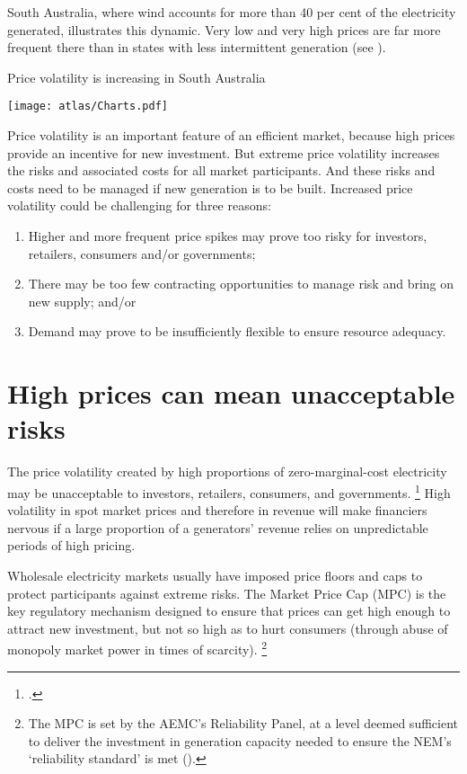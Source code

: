 \documentclass[FrontPage]{grattan}
\begin{document}
South Australia, where wind accounts for more than 40 per cent of the electricity generated, illustrates this dynamic. Very low and very high prices are far more frequent there than in states with less intermittent generation (see ).

\begin{figureTop}
\caption{Price volatility is increasing in South Australia}\label{fig:price-volatility-is-increasing-in-South-Australia}
\texttt{[image: atlas/Charts.pdf]}
\end{figureTop}

Price volatility is an important feature of an efficient market, because high prices provide an incentive for new investment. But extreme price volatility increases the risks and associated costs for all market participants. And these risks and costs need to be managed if new generation is to be built. Increased price volatility could be challenging for three reasons:
\begin{enumerate}
    \item Higher and more frequent price spikes may prove too risky for investors, retailers, consumers and/or governments;
    \item There may be too few contracting opportunities to manage risk and bring on new supply; and/or
    \item Demand may prove to be insufficiently flexible to ensure resource adequacy.
\end{enumerate}

\section{High prices can mean unacceptable risks}\label{sec:high-prices-mean-unacceptable-risks}
The price volatility created by high proportions of zero-marginal-cost electricity may be unacceptable to investors, retailers, consumers, and governments.%
\footcites{Nelson2016NewNEM}{AESO2016AlbertaMarketReform}
High volatility in spot market prices and therefore in revenue will make financiers nervous if a large proportion of a generators' revenue relies on unpredictable periods of high pricing. 

Wholesale electricity markets usually have imposed price floors and caps to protect participants against extreme risks. The Market Price Cap (MPC) is the key regulatory mechanism designed to ensure that prices can get high enough to attract new investment, but not so high as to hurt consumers (through abuse of monopoly market power in times of scarcity).%
\footnote{The MPC is set by the AEMC's Reliability Panel, at a level deemed sufficient to deliver the investment in generation capacity needed to ensure the NEM's `reliability standard' is met (\textcite{AEMC2017ReliabilityStandardReview}).}
\end{document}
